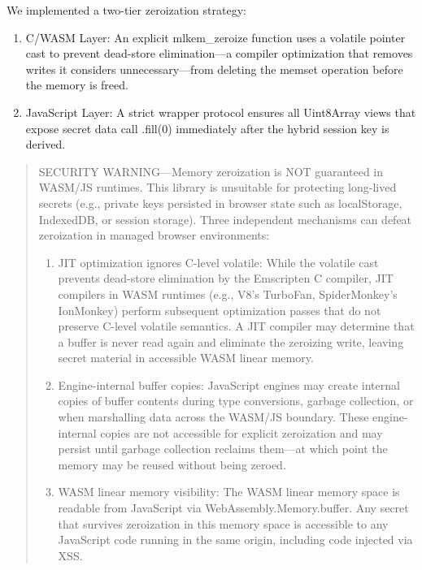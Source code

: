 \documentclass[11pt,a4paper]{article}
\def\textbf#1{#1}%
\def\texttt#1{#1}%
\begin{document}
We implemented a two-tier zeroization strategy:
\begin{enumerate}
    \item \textbf{C/WASM Layer:} An explicit \texttt{mlkem\_zeroize} function uses a \texttt{volatile} pointer cast to prevent dead-store elimination---a compiler optimization that removes writes it considers unnecessary---from deleting the \texttt{memset} operation before the memory is freed.
    \item \textbf{JavaScript Layer:} A strict wrapper protocol ensures all \texttt{Uint8Array} views that expose secret data call \texttt{.fill(0)} immediately after the hybrid session key is derived.
\end{enumerate}

\begin{quote}
\textbf{SECURITY WARNING---Memory zeroization is NOT guaranteed in WASM/JS runtimes.} This library is \textbf{unsuitable for protecting long-lived secrets} (e.g., private keys persisted in browser state such as \texttt{localStorage}, \texttt{IndexedDB}, or session storage). Three independent mechanisms can defeat zeroization in managed browser environments:
\begin{enumerate}
    \item \textbf{JIT optimization ignores C-level \texttt{volatile}:} While the \texttt{volatile} cast prevents dead-store elimination by the Emscripten C compiler, JIT compilers in WASM runtimes (e.g., V8's TurboFan, SpiderMonkey's IonMonkey) perform subsequent optimization passes that do not preserve C-level \texttt{volatile} semantics. A JIT compiler may determine that a buffer is never read again and eliminate the zeroizing write, \textbf{leaving secret material in accessible WASM linear memory}.
    \item \textbf{Engine-internal buffer copies:} JavaScript engines may create internal copies of buffer contents during type conversions, garbage collection, or when marshalling data across the WASM/JS boundary. These engine-internal copies are \textbf{not accessible for explicit zeroization} and may persist until garbage collection reclaims them---at which point the memory may be reused without being zeroed.
    \item \textbf{WASM linear memory visibility:} The WASM linear memory space is readable from JavaScript via \texttt{WebAssembly.Memory.buffer}. Any secret that survives zeroization in this memory space is accessible to any JavaScript code running in the same origin, including code injected via XSS.
\end{enumerate}

\end{quote}
\end{document}
